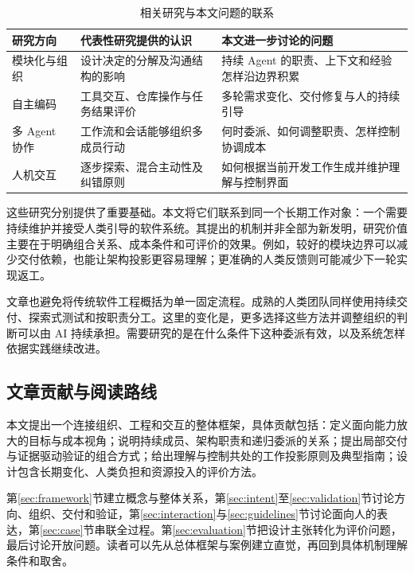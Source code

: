 \begin{table}[htbp]\centering\small
\caption{相关研究与本文问题的联系}\label{tab:related}
\begin{tabularx}{\linewidth}{p{2.4cm}YY}\toprule
研究方向 & 代表性研究提供的认识 & 本文进一步讨论的问题\\\midrule
模块化与组织 & 设计决定的分解及沟通结构的影响\cite{parnas1972,conway1968} & 持续 Agent 的职责、上下文和经验怎样沿边界积累\\
自主编码 & 工具交互、仓库操作与任务结果评价\cite{sweagent,swebench} & 多轮需求变化、交付修复与人的持续引导\\
多 Agent 协作 & 工作流和会话能够组织多成员行动\cite{metagpt,autogen} & 何时委派、如何调整职责、怎样控制协调成本\\
人机交互 & 逐步探索、混合主动性及纠错原则\cite{shneiderman1996,horvitz1999,amershi2019} & 如何根据当前开发工作生成并维护理解与控制界面\\\bottomrule
\end{tabularx}\end{table}

这些研究分别提供了重要基础。本文将它们联系到同一个长期工作对象：一个需要持续维护并接受人类引导的软件系统。其提出的机制并非全部为新发明，研究价值主要在于明确组合关系、成本条件和可评价的效果。例如，较好的模块边界可以减少交付依赖，也能让架构投影更容易理解；更准确的人类反馈则可能减少下一轮实现返工。

文章也避免将传统软件工程概括为单一固定流程。成熟的人类团队同样使用持续交付、探索式测试和按职责分工。这里的变化是，更多选择这些方法并调整组织的判断可以由 AI 持续承担。需要研究的是在什么条件下这种委派有效，以及系统怎样依据实践继续改进。

\subsection{文章贡献与阅读路线}
本文提出一个连接组织、工程和交互的整体框架，具体贡献包括：定义面向能力放大的目标与成本视角；说明持续成员、架构职责和递归委派的关系；提出局部交付与证据驱动验证的组合方式；给出理解与控制共处的工作投影原则及典型指南；设计包含长期变化、人类负担和资源投入的评价方法。

第\ref{sec:framework}节建立概念与整体关系，第\ref{sec:intent}至\ref{sec:validation}节讨论方向、组织、交付和验证，第\ref{sec:interaction}与\ref{sec:guidelines}节讨论面向人的表达，第\ref{sec:case}节串联全过程。第\ref{sec:evaluation}节把设计主张转化为评价问题，最后讨论开放问题。读者可以先从总体框架与案例建立直觉，再回到具体机制理解条件和取舍。
